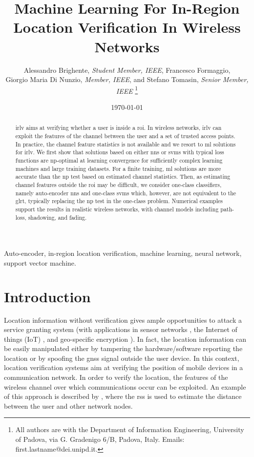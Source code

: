 \documentclass[draftcls,journal,onecolumn]{IEEEtran}
\title{Machine Learning For In-Region Location Verification In Wireless Networks}
\author{Alessandro Brighente, \textit{Student Member, IEEE}, Francesco Formaggio,\\  Giorgio Maria Di Nunzio, \textit{Member, IEEE}, and  Stefano Tomasin, \textit{Senior Member, IEEE} \thanks{All authors are with the Department of Information Engineering, University of Padova, via G. Gradenigo 6/B, Padova, Italy. Emails: first.lastname@dei.unipd.it.}
}
\date{\today}
\begin{document}
\maketitle

\sloppy

\begin{abstract}
\Ac{irlv} aims at verifying whether a user is inside a \ac{roi}. In wireless networks, \ac{irlv} can exploit the features of the channel between the user and a set of trusted access points. In practice, the channel feature statistics is not available and we resort to \ac{ml} solutions for \ac{irlv}. We first show that solutions based on either \acp{nn} or \acp{svm} with typical loss functions are \ac{np}-optimal at learning convergence for sufficiently complex learning machines and large training datasets. For a finite training, \ac{ml} solutions are more accurate than the \ac{np} test based on estimated channel statistics. Then, as estimating channel features outside the \ac{roi} may be difficult, we consider one-class classifiers, namely auto-encoder \acp{nn} and one-class \acp{svm} which, however, are not equivalent to the \acf{glrt},  typically replacing the \ac{np} test in the one-class problem.  Numerical examples support the results in realistic wireless networks, with channel models including path-loss, shadowing, and fading.
\end{abstract}

\begin{IEEEkeywords}
Auto-encoder, in-region location verification, machine learning, neural network, support vector machine.
\end{IEEEkeywords}

\glsresetall
\section{Introduction}
\label{sec:intro}

{Location information without verification gives ample opportunities to attack a service granting system (with  applications in sensor networks \mbox{\cite{Zeng-survey, 8376254, wei2013}}, the Internet of things (IoT) \cite{7903611}, and geo-specific encryption \cite{quaglia}). In fact, the location information can be easily manipulated either by tampering the hardware/software reporting the location or by spoofing the \ac{gnss} signal outside the user device. In this context, location verification systems aim at verifying the position of mobile devices in a communication network.  In order to verify the location, the features of the wireless channel over which communications occur can be exploited. An example of this approach is described by {\cite{li2010security}}, where the \ac{rss} is used to estimate the distance between the user and other network nodes.}
\end{document}
